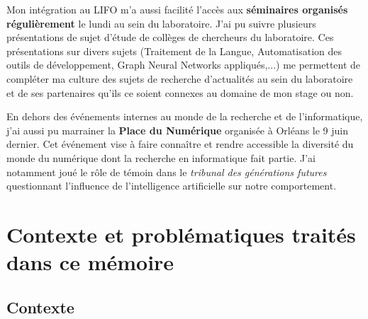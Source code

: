     Mon intégration au LIFO m'a aussi facilité l'accès aux \textbf{séminaires organisés régulièrement} le lundi au sein du laboratoire. J'ai pu suivre plusieurs présentations de sujet d'étude de collèges de chercheurs du laboratoire. Ces présentations sur divers sujets (Traitement de la Langue, Automatisation des outils de développement, Graph Neural Networks appliqués,...) me permettent de compléter ma culture des sujets de recherche d'actualités au sein du laboratoire et de ses partenaires qu'ils ce soient connexes au domaine de mon stage ou non.

    En dehors des événements internes au monde de la recherche et de l'informatique, j'ai aussi pu marrainer la \textbf{Place du Numérique} organisée à Orléans le 9 juin dernier. Cet événement vise à faire connaître et rendre accessible la diversité du monde du numérique dont la recherche en informatique fait partie. J'ai notamment joué le rôle de témoin dans le \textit{tribunal des générations futures} questionnant l'influence de l'intelligence artificielle sur notre comportement.

\section{Contexte et problématiques traités dans ce mémoire}
    \subsection{Contexte}

